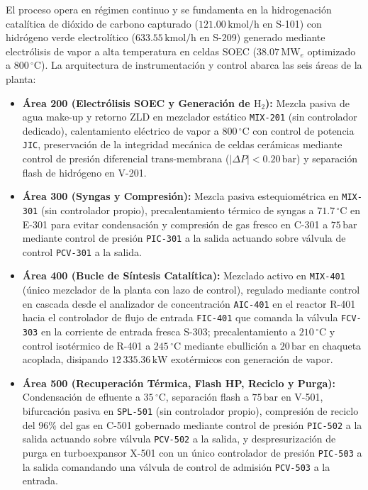 \documentclass[10pt,letterpaper]{article}
\begin{document}
El proceso opera en régimen continuo y se fundamenta en la hidrogenación catalítica de dióxido de carbono capturado ($121.00\,\text{kmol/h}$ en S-101) con hidrógeno verde electrolítico ($633.55\,\text{kmol/h}$ en S-209) generado mediante electrólisis de vapor a alta temperatura en celdas SOEC ($38.07\,\text{MW}_e$ optimizado a $800\,^\circ\text{C}$). La arquitectura de instrumentación y control abarca las seis áreas de la planta:
\begin{itemize}
    \item \textbf{Área 200 (Electrólisis SOEC y Generación de $\text{H}_2$):} Mezcla pasiva de agua make-up y retorno ZLD en mezclador estático \texttt{MIX-201} (sin controlador dedicado), calentamiento eléctrico de vapor a $800\,^\circ\text{C}$ con control de potencia \texttt{JIC}, preservación de la integridad mecánica de celdas cerámicas mediante control de presión diferencial trans-membrana ($|\Delta P| < 0.20\,\text{bar}$) y separación flash de hidrógeno en V-201.
    \item \textbf{Área 300 (Syngas y Compresión):} Mezcla pasiva estequiométrica en \texttt{MIX-301} (sin controlador propio), precalentamiento térmico de syngas a $71.7\,^\circ\text{C}$ en E-301 para evitar condensación y compresión de gas fresco en C-301 a $75\,\text{bar}$ mediante control de presión \texttt{PIC-301} a la salida actuando sobre válvula de control \texttt{PCV-301} a la salida.
    \item \textbf{Área 400 (Bucle de Síntesis Catalítica):} Mezclado activo en \texttt{MIX-401} (único mezclador de la planta con lazo de control), regulado mediante control en cascada desde el analizador de concentración \texttt{AIC-401} en el reactor R-401 hacia el controlador de flujo de entrada \texttt{FIC-401} que comanda la válvula \texttt{FCV-303} en la corriente de entrada fresca S-303; precalentamiento a $210\,^\circ\text{C}$ y control isotérmico de R-401 a $245\,^\circ\text{C}$ mediante ebullición a $20\,\text{bar}$ en chaqueta acoplada, disipando $12\,335.36\,\text{kW}$ exotérmicos con generación de vapor.
    \item \textbf{Área 500 (Recuperación Térmica, Flash HP, Reciclo y Purga):} Condensación de efluente a $35\,^\circ\text{C}$, separación flash a $75\,\text{bar}$ en V-501, bifurcación pasiva en \texttt{SPL-501} (sin controlador propio), compresión de reciclo del 96\% del gas en C-501 gobernado mediante control de presión \texttt{PIC-502} a la salida actuando sobre válvula \texttt{PCV-502} a la salida, y despresurización de purga en turboexpansor X-501 con un único controlador de presión \texttt{PIC-503} a la salida comandando una válvula de control de admisión \texttt{PCV-503} a la entrada.

\end{itemize}
\end{document}

